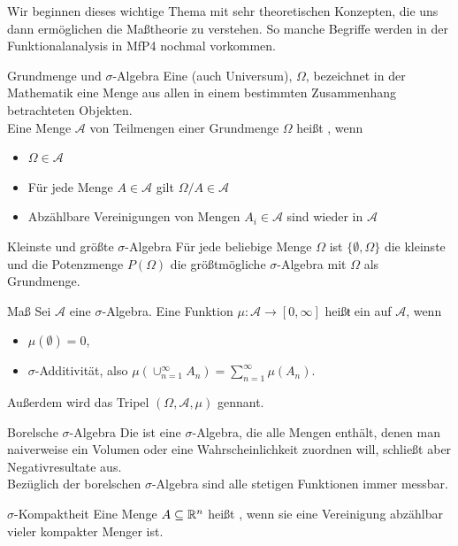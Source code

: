 Wir beginnen dieses wichtige Thema mit sehr theoretischen Konzepten, die uns dann ermöglichen die Maßtheorie zu verstehen. So manche Begriffe werden in der Funktionalanalysis in MfP4 nochmal vorkommen.
\begin{Def}{Grundmenge und $\sigma$-Algebra}
Eine  (auch Universum), $\Omega$, bezeichnet in der Mathematik eine Menge aus allen in einem bestimmten Zusammenhang betrachteten Objekten. \\
Eine Menge $\mathcal{A}$ von Teilmengen einer Grundmenge $\Omega$ heißt , wenn
\begin{itemize}
    \item $\Omega \in \mathcal{A}$
    \item Für jede Menge $A\in \mathcal{A}$ gilt $\Omega / A\in \mathcal{A}$
    \item Abzählbare Vereinigungen von Mengen $A_i\in \mathcal{A}$ sind wieder in $\mathcal{A}$
\end{itemize}
\end{Def}
\begin{Beispiel}{Kleinste und größte $\sigma$-Algebra}
Für jede beliebige Menge $\Omega$ ist $\{\emptyset, \Omega\}$ die kleinste und die Potenzmenge $P(\Omega)$ die größtmögliche $\sigma$-Algebra mit $\Omega$ als Grundmenge.
\end{Beispiel}
\begin{Def}{Maß}
Sei $\mathcal{A}$ eine $\sigma$-Algebra. Eine Funktion $\mu: \mathcal{A}\rightarrow[0,\infty]$ heißŧ ein  auf $\mathcal{A}$, wenn
\begin{itemize}
    \item $\mu(\emptyset)=0$,
    \item $\sigma$-Additivität, also $\mu(\cup_{n=1}^\infty A_n)=\sum_{n=1}^\infty \mu(A_n)$.
\end{itemize}
Außerdem wird das Tripel $(\Omega, \mathcal{A}, \mu)$  gennant.
\end{Def}
\begin{Beispiel}{Borelsche $\sigma$-Algebra}
Die  ist eine $\sigma$-Algebra, die alle Mengen enthält, denen man naiverweise ein Volumen oder eine Wahrscheinlichkeit zuordnen will, schließt aber Negativresultate aus. \\
Bezüglich der borelschen $\sigma$-Algebra sind alle stetigen Funktionen immer messbar.
\end{Beispiel}
\begin{Def}{$\sigma$-Kompaktheit}
    Eine Menge $A\subseteq \mathbb{R}^n$ heißt , wenn sie eine Vereinigung abzählbar vieler kompakter Menger ist.
\end{Def}
